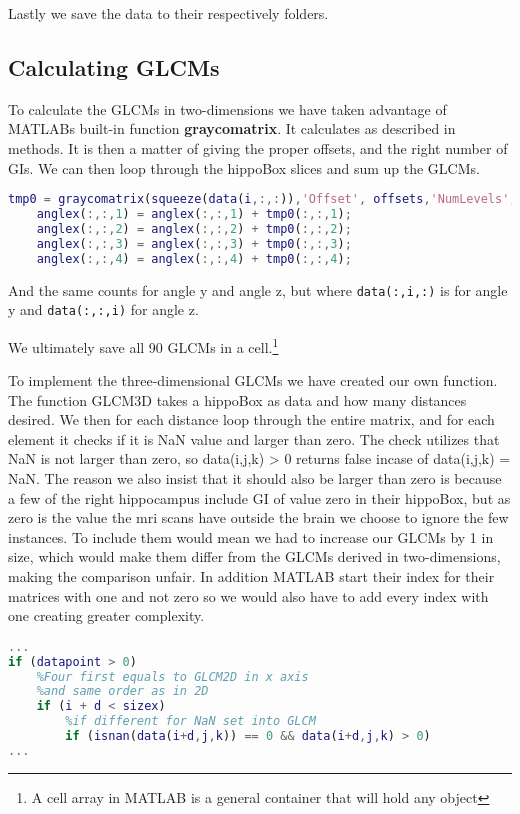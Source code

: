 Lastly we save the data to their respectively folders.

\subsection{Calculating GLCMs}

To calculate the GLCMs in two-dimensions we have taken advantage of MATLABs built-in function \textbf{graycomatrix}. It calculates as described in methods. It is then a matter of giving the proper offsets, and the right number of GIs. We can then loop through the hippoBox slices and sum up the GLCMs.

\begin{lstlisting}[language=Matlab]
    tmp0 = graycomatrix(squeeze(data(i,:,:)),'Offset', offsets,'NumLevels', 256, 'GrayLimits', [0 256]);
    anglex(:,:,1) = anglex(:,:,1) + tmp0(:,:,1);
    anglex(:,:,2) = anglex(:,:,2) + tmp0(:,:,2);
    anglex(:,:,3) = anglex(:,:,3) + tmp0(:,:,3);
    anglex(:,:,4) = anglex(:,:,4) + tmp0(:,:,4);
\end{lstlisting}

And the same counts for angle y and angle z, but where \texttt{data(:,i,:)} is for angle y and \texttt{data(:,:,i)} for angle z.

We ultimately save all 90 GLCMs in a cell.\footnote{A cell array in MATLAB is a general container that will hold any object}

To implement the three-dimensional GLCMs we have created our own function.
The function GLCM3D takes a hippoBox as data and how many distances desired. We then for each distance loop through the entire matrix, and for each element it checks if it is NaN value and larger than zero. The check utilizes that NaN is not larger than zero, so data(i,j,k) > 0 returns false incase of data(i,j,k) = NaN.
The reason we also insist that it should also be larger than zero is because a few of the right hippocampus include GI of value zero in their hippoBox, but as zero is the value the mri scans have outside the brain we choose to ignore the few instances. To include them would mean we had to increase our GLCMs by 1 in size, which would make them differ from the GLCMs derived in two-dimensions, making the comparison unfair. In addition MATLAB start their index for their matrices with one and not zero so we would also have to add every index with one creating greater complexity.

\begin{lstlisting}[language=Matlab]
...
if (datapoint > 0)
    %Four first equals to GLCM2D in x axis
    %and same order as in 2D
    if (i + d < sizex)
        %if different for NaN set into GLCM
        if (isnan(data(i+d,j,k)) == 0 && data(i+d,j,k) > 0)
...
\end{lstlisting}

